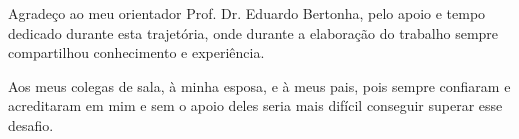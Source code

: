 
\begin{agradecimentos}%

Agradeço ao meu orientador Prof. Dr. Eduardo Bertonha, pelo apoio e tempo dedicado durante esta trajetória, onde durante a elaboração do trabalho sempre compartilhou conhecimento e experiência.

Aos meus colegas de sala, à minha esposa, e à meus pais, pois sempre confiaram e acreditaram em mim e sem o apoio deles seria mais difícil conseguir superar esse desafio. 

\end{agradecimentos}

